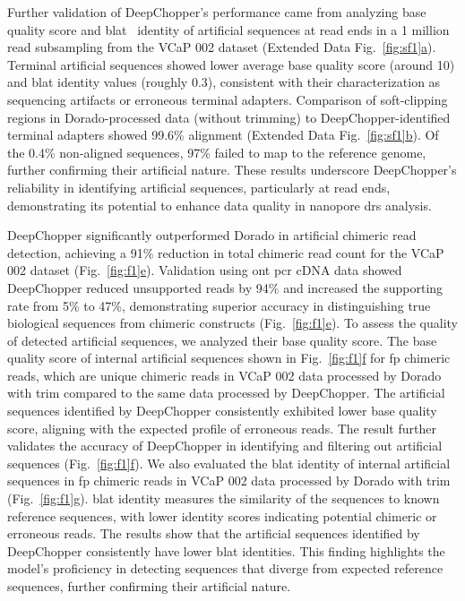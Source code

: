 \documentclass[pdflatex, sn-mathphys-num, lineno]{sn-jnl}%
\newcommand{\figref}[2]{Fig.~\hyperref[#1]{\ref*{#1}#2}}
\newcommand{\edfigref}[2]{Extended Data Fig.~\hyperref[#1]{\ref*{#1}#2}}
\theoremstyle{thmstyleone}%
\theoremstyle{thmstyletwo}%
\theoremstyle{thmstylethree}%
\begin{document}
Further validation of DeepChopper's performance came from analyzing base quality score and \gls{blat}~\cite{kent2002blat} identity of artificial sequences at read ends in a 1 million read subsampling from the VCaP 002 dataset (\edfigref{fig:sf1}{a}).
Terminal artificial sequences showed lower average base quality score (around 10) and \gls{blat} identity values (roughly 0.3), consistent with their characterization as sequencing artifacts or erroneous terminal adapters.
Comparison of soft-clipping regions in Dorado-processed data (without trimming) to DeepChopper-identified terminal adapters showed 99.6\% alignment (\edfigref{fig:sf1}{b}).
Of the 0.4\% non-aligned sequences, 97\% failed to map to the reference genome, further confirming their artificial nature.
These results underscore DeepChopper's reliability in identifying artificial sequences, particularly at read ends, demonstrating its potential to enhance data quality in nanopore \gls{drs} analysis.

DeepChopper significantly outperformed Dorado in artificial chimeric read detection, achieving a 91\% reduction in total chimeric read count for the VCaP 002 dataset (\figref{fig:f1}{e}).
Validation using \gls{ont} \gls{pcr} cDNA data showed DeepChopper reduced unsupported reads by 94\% and increased the supporting rate from 5\% to 47\%, demonstrating superior accuracy in distinguishing true biological sequences from chimeric constructs (\figref{fig:f1}{e}).
To assess the quality of detected artificial sequences, we analyzed their base quality score.
The base quality score of internal artificial sequences shown in \figref{fig:f1}{f}  for \gls{fp} chimeric reads, which are unique chimeric reads in VCaP 002 data processed by Dorado with trim compared to the same data processed by DeepChopper.
The artificial sequences identified by DeepChopper consistently exhibited lower base quality score, aligning with the expected profile of erroneous reads.
The result further validates the accuracy of DeepChopper in identifying and filtering out artificial sequences (\figref{fig:f1}{f}).
We also evaluated the \gls{blat} identity of internal artificial sequences in \gls{fp} chimeric reads in VCaP 002 data processed by Dorado with trim  (\figref{fig:f1}{g}).
\gls{blat} identity measures the similarity of the sequences to known reference sequences, with lower identity scores indicating potential chimeric or erroneous reads.
The results show that the artificial sequences identified by DeepChopper consistently have lower \gls{blat} identities.
This finding highlights the model's proficiency in detecting sequences that diverge from expected reference sequences, further confirming their artificial nature.
\end{document}
